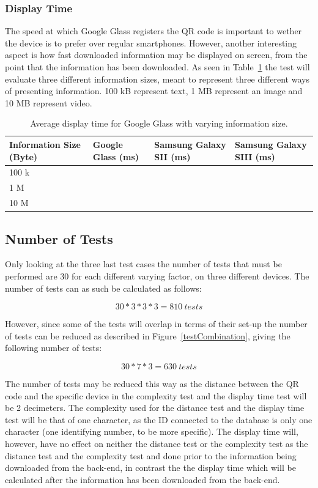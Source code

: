 \subsubsection{Display Time}
The speed at which Google Glass registers the QR code is important to wether the device is to prefer over regular smartphones. However, another interesting aspect is how fast downloaded information may be displayed on screen, from the point that the information has been downloaded. As seen in Table~\ref{tab:averageDisplaySpeedGoogleGlass} the test will evaluate three different information sizes, meant to represent three different ways of presenting information. 100 kB represent text, 1 MB represent an image and 10 MB represent video.

	\begin{table}[ht!]
    		\caption{Average display time for Google Glass with varying information size.} \label{tab:averageDisplaySpeedGoogleGlass}
		\centering \begin{tabularx}{\textwidth}{l|X|X|X} \hline
		\textbf{Information Size (Byte)} & \textbf{Google Glass (ms)}  & \textbf{Samsung Galaxy SII (ms)}  & \textbf{Samsung Galaxy SIII (ms)} \\ \hline \hline
       
		100 k	&	&	&	 \\ \hline
		1 M		&	&	&	 \\ \hline
		10 M		&	&	&	 \\ \hline

		\end{tabularx}
	\end{table}

\subsection{Number of Tests}
Only looking at the three last test cases the number of tests that must be performed are 30 for each different varying factor, on three different devices. The number of tests can as such be calculated as follows:

\[30 * 3 * 3 * 3 = 810~tests\]

However, since some of the tests will overlap in terms of their set-up the number of tests can be reduced as described in Figure~\ref{testCombination}, giving the following number of tests:

\[30 * 7 * 3 = 630~tests\]

The number of tests may be reduced this way as the distance between the QR code and the specific device in the complexity test and the display time test will be 2 decimeters. The complexity used for the distance test and the display time test will be that of one character, as the ID connected to the database is only one character (one identifying number, to be more specific). The display time will, however, have no effect on neither the distance test or the complexity test as the distance test and the complexity test and done prior to the information being downloaded from the back-end, in contrast the the display time which will be calculated after the information has been downloaded from the back-end.


